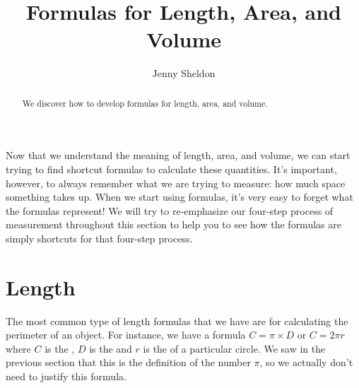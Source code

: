 \documentclass{ximera}
\title{Formulas for Length, Area, and Volume}
\author{Jenny Sheldon}
\begin{document}
\begin{abstract}
We discover how to develop formulas for length, area, and volume.
\end{abstract}
\maketitle

Now that we understand the meaning of length, area, and volume, we can start trying to find shortcut formulas to calculate these quantities. It's important, however, to always remember what we are trying to measure: how much space something takes up. When we start using formulas, it's very easy to forget what the formulas represent! We will try to re-emphasize our four-step process of measurement throughout this section to help you to see how the formulas are simply shortcuts for that four-step process.


\section{Length}
The most common type of length formulas that we have are for calculating the perimeter of an object. For instance, we have a formula $C = \pi \times D$ or $C = 2 \pi r$ where $C$ is the , $D$ is the  and $r$ is the  of a particular circle. We saw in the previous section that this is the definition of the number $\pi$, so we actually don't need to justify this formula.
\end{document}
